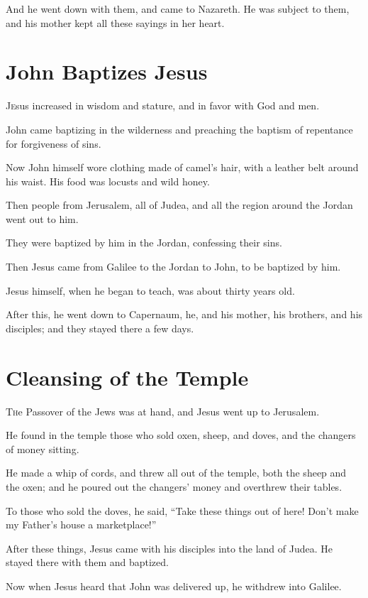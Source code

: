 And he went down with them, and came to Nazareth. He was subject to them, and his mother kept all these sayings in her heart.

\clearpage \section*{John Baptizes Jesus}
\chapterornament

\lettrine{J}esus increased in wisdom and stature, and in favor with God and men.

John came baptizing in the wilderness and preaching the baptism of repentance for forgiveness of sins.

Now John himself wore clothing made of camel’s hair, with a leather belt around his waist. His food was locusts and wild honey.

Then people from Jerusalem, all of Judea, and all the region around the Jordan went out to him.

They were baptized by him in the Jordan, confessing their sins.

Then Jesus came from Galilee to the Jordan to John, to be baptized by him.

Jesus himself, when he began to teach, was about thirty years old.

After this, he went down to Capernaum, he, and his mother, his brothers, and his disciples; and they stayed there a few days.

\clearpage \section*{Cleansing of the Temple}
\chapterornament

\lettrine{T}he Passover of the Jews was at hand, and Jesus went up to Jerusalem.

He found in the temple those who sold oxen, sheep, and doves, and the changers of money sitting.

He made a whip of cords, and threw all out of the temple, both the sheep and the oxen; and he poured out the changers’ money and overthrew their tables.

To those who sold the doves, he said, “Take these things out of here! Don’t make my Father’s house a marketplace!”

After these things, Jesus came with his disciples into the land of Judea. He stayed there with them and baptized.

Now when Jesus heard that John was delivered up, he withdrew into Galilee.

